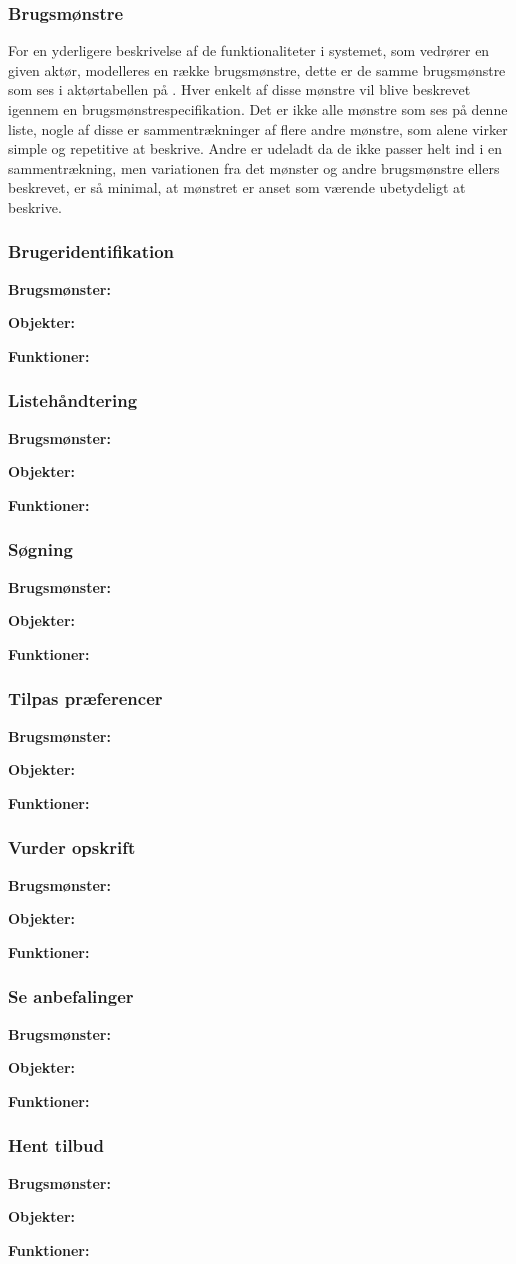 \subsubsection*{Brugsmønstre}
For en yderligere beskrivelse af de funktionaliteter i systemet, som vedrører en given aktør, modelleres en række brugsmønstre, dette er de samme brugsmønstre som ses i aktørtabellen på . 
Hver enkelt af disse mønstre vil blive beskrevet igennem en brugsmønstrespecifikation. 
Det er ikke alle mønstre som ses på denne liste, nogle af disse er sammentrækninger af flere andre mønstre, som alene virker simple og repetitive at beskrive. 
Andre er udeladt da de ikke passer helt ind i en sammentrækning, men variationen fra det mønster og andre brugsmønstre ellers beskrevet, er så minimal, at mønstret er anset som værende ubetydeligt at beskrive.

\subsubsection*{Brugeridentifikation}
\textbf{Brugsmønster:}

\textbf{Objekter:}

\textbf{Funktioner:}

\subsubsection*{Listehåndtering}
\textbf{Brugsmønster:}

\textbf{Objekter:}

\textbf{Funktioner:}

\subsubsection*{Søgning}
\textbf{Brugsmønster:}

\textbf{Objekter:}

\textbf{Funktioner:}

\subsubsection*{Tilpas præferencer}
\textbf{Brugsmønster:}

\textbf{Objekter:}

\textbf{Funktioner:}

\subsubsection*{Vurder opskrift}
\textbf{Brugsmønster:}

\textbf{Objekter:}

\textbf{Funktioner:}

\subsubsection*{Se anbefalinger}
\textbf{Brugsmønster:}

\textbf{Objekter:}

\textbf{Funktioner:}

\subsubsection*{Hent tilbud}
\textbf{Brugsmønster:}

\textbf{Objekter:}

\textbf{Funktioner:}